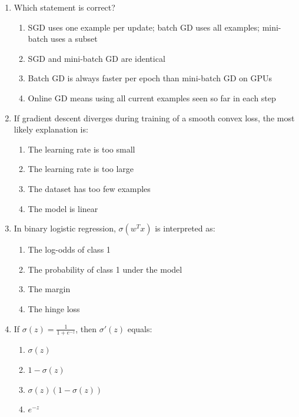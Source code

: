\documentclass[11pt]{article}
\newcommand{\cmark}{\ding{51}}
\begin{document}
\begin{enumerate}[leftmargin=*]
\item Which statement is correct?

\begin{enumerate}[label=\Alph*.]
    \item SGD uses one example per update; batch GD uses all examples; mini-batch uses a subset \cmark
    \item SGD and mini-batch GD are identical
    \item Batch GD is always faster per epoch than mini-batch GD on GPUs
    \item Online GD means using all current examples seen so far in each step
\end{enumerate}

\item If gradient descent diverges during training of a smooth convex loss, the most likely explanation is:

\begin{enumerate}[label=\Alph*.]
    \item The learning rate is too small
    \item The learning rate is too large \cmark
    \item The dataset has too few examples
    \item The model is linear
\end{enumerate}

\item In binary logistic regression, $\sigma(w^T x)$ is interpreted as:

\begin{enumerate}[label=\Alph*.]
    \item The log-odds of class 1
    \item The probability of class 1 under the model \cmark
    \item The margin
    \item The hinge loss
\end{enumerate}

\item If $\sigma(z)=\frac{1}{1+e^{-z}}$, then $\sigma'(z)$ equals:

\begin{enumerate}[label=\Alph*.]
    \item $\sigma(z)$
    \item $1-\sigma(z)$
    \item $\sigma(z)(1-\sigma(z))$ \cmark
    \item $e^{-z}$
\end{enumerate}


\end{enumerate}
\end{document}
